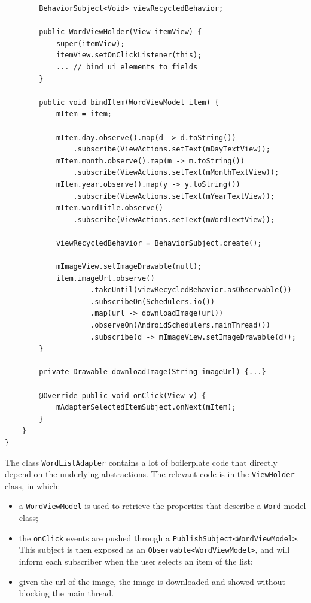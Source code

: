 \begin{verbatim}
        BehaviorSubject<Void> viewRecycledBehavior;

        public WordViewHolder(View itemView) {
            super(itemView);
            itemView.setOnClickListener(this);
            ... // bind ui elements to fields
        }

        public void bindItem(WordViewModel item) {
            mItem = item;

            mItem.day.observe().map(d -> d.toString())
                .subscribe(ViewActions.setText(mDayTextView));
            mItem.month.observe().map(m -> m.toString())
                .subscribe(ViewActions.setText(mMonthTextView));
            mItem.year.observe().map(y -> y.toString())
                .subscribe(ViewActions.setText(mYearTextView));
            mItem.wordTitle.observe()
                .subscribe(ViewActions.setText(mWordTextView));

            viewRecycledBehavior = BehaviorSubject.create();

            mImageView.setImageDrawable(null);
            item.imageUrl.observe()
                    .takeUntil(viewRecycledBehavior.asObservable())
                    .subscribeOn(Schedulers.io())
                    .map(url -> downloadImage(url))
                    .observeOn(AndroidSchedulers.mainThread())
                    .subscribe(d -> mImageView.setImageDrawable(d));
        }

        private Drawable downloadImage(String imageUrl) {...}

        @Override public void onClick(View v) {
            mAdapterSelectedItemSubject.onNext(mItem);
        }
    }
}
\end{verbatim}

The class \texttt{WordListAdapter} contains a lot of boilerplate code
that directly depend on the underlying abstractions. The relevant code is
in the \texttt{ViewHolder} class, in which:

\begin{itemize}
\itemsep1pt\parskip0pt
\item
  a \texttt{WordViewModel} is used to retrieve the properties that
  describe a \texttt{Word} model class;
\item
  the \texttt{onClick} events are pushed through a
  \texttt{PublishSubject\textless{}WordViewModel\textgreater{}}. This
  subject is then exposed as an
  \texttt{Observable\textless{}WordViewModel\textgreater{}}, and will
  inform each subscriber when the user selects an item of the list;
\item
  given the url of the image, the image is downloaded and showed without
  blocking the main thread.
\end{itemize}


